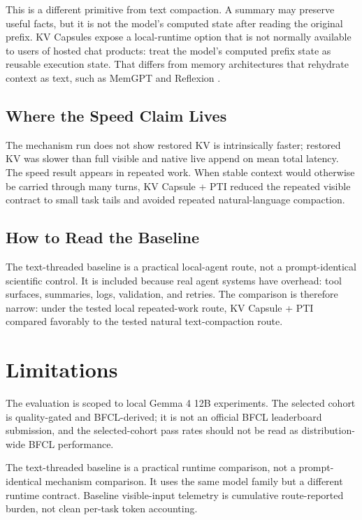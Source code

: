\documentclass[11pt]{article}
\begin{document}
This is a different primitive from text compaction. A summary may preserve useful facts, but it is not the model's computed state after reading the original prefix. KV Capsules expose a local-runtime option that is not normally available to users of hosted chat products: treat the model's computed prefix state as reusable execution state. That differs from memory architectures that rehydrate context as text, such as MemGPT and Reflexion \cite{packer2023memgpt,shinn2023reflexion}.

\subsection{Where the Speed Claim Lives}

The mechanism run does not show restored KV is intrinsically faster; restored KV was slower than full visible and native live append on mean total latency. The speed result appears in repeated work. When stable context would otherwise be carried through many turns, KV Capsule + PTI reduced the repeated visible contract to small task tails and avoided repeated natural-language compaction.

\subsection{How to Read the Baseline}

The text-threaded baseline is a practical local-agent route, not a prompt-identical scientific control. It is included because real agent systems have overhead: tool surfaces, summaries, logs, validation, and retries. The comparison is therefore narrow: under the tested local repeated-work route, KV Capsule + PTI compared favorably to the tested natural text-compaction route.

\section{Limitations}

The evaluation is scoped to local Gemma 4 12B experiments. The selected cohort is quality-gated and BFCL-derived; it is not an official BFCL leaderboard submission, and the selected-cohort pass rates should not be read as distribution-wide BFCL performance.

The text-threaded baseline is a practical runtime comparison, not a prompt-identical mechanism comparison. It uses the same model family but a different runtime contract. Baseline visible-input telemetry is cumulative route-reported burden, not clean per-task token accounting.
\end{document}
